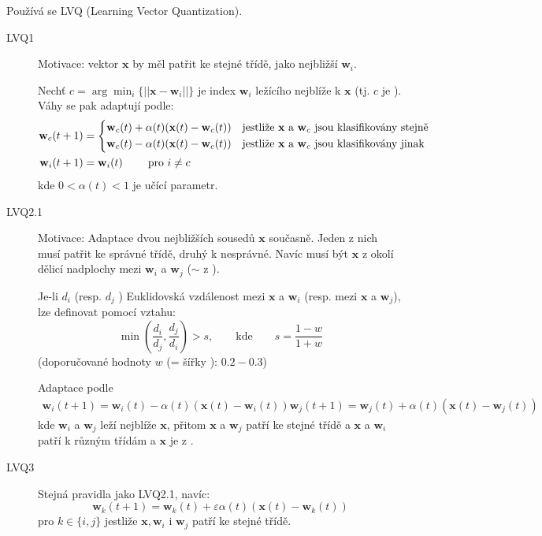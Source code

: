 \documentclass[11pt]{report} %
\renewcommand{\vec}[1]{\mathbf{#1}}
\numberwithin{equation}{section}
\begin{document}
Používá se LVQ (Learning Vector Quantization).
\begin{description}
	\item[LVQ1] Motivace: vektor $\vec{x}$ by měl patřit ke stejné třídě, jako nejbližší $\vec{w}_i$. 
	
	Nechť $c = \arg \min_{i}\{||\vec{x} - \vec{w}_i||\}$ je index $\vec{w}_i$ ležícího nejblíže k $\vec{x}$ (tj. $c$ je ). Váhy se pak adaptují podle:
	\begin{align*}
		\vec{w}_c(t+1) &= 
		\begin{dcases*}
		\vec{w}_c(t) + \alpha(t)(\vec{x}(t) - \vec{w}_c(t)) & jestliže $\vec{x}$ a $\vec{w}_c$ jsou klasifikovány stejně \\
		\vec{w}_c(t) - \alpha(t)(\vec{x}(t) - \vec{w}_c(t)) & jestliže $\vec{x}$ a $\vec{w}_c$ jsou klasifikovány jinak \\
		\end{dcases*}	\\
		\vec{w}_i(t+1) &= \vec{w}_i(t)\qquad \text{ pro $i \neq c$}\\
	\end{align*}
	kde $0 < \alpha(t) < 1$ je učící parametr.
	
	\item[LVQ2.1] Motivace: Adaptace dvou nejbližších sousedů $\vec{x}$ současně. Jeden z nich musí patřit ke správné třídě, druhý k nesprávné. Navíc musí být $\vec{x}$ z okolí dělicí nadplochy mezi $\vec{w}_i$ a $\vec{w}_j$ ($\sim$ z ).
	
	Je-li $d_i$ (resp. $d_j$ ) Euklidovská vzdálenost mezi $\vec{x}$ a $\vec{w}_i$ (resp. mezi $\vec{x}$ a $\vec{w}_j$), lze  definovat pomocí vztahu:
	$$\min\left(\frac{d_i}{d_j},\frac{d_j}{d_i} \right) > s, \qquad \text{kde}\qquad s = \frac{1-w}{1+w}$$	
	(doporučované hodnoty $w$ (= šířky ): $0.2 - 0.3$)
	
	Adaptace podle
	\begin{align*}
	\vec{w}_i(t+1) = \vec{w}_i(t) - \alpha(t)(\vec{x}(t) - \vec{w}_i(t))		
	\vec{w}_j(t+1) = \vec{w}_j(t) + \alpha(t)(\vec{x}(t) - \vec{w}_j(t))
	\end{align*}
	kde $\vec{w}_i$ a $\vec{w}_j$ leží nejblíže $\vec{x}$, přitom $\vec{x}$ a $\vec{w}_j$ patří ke stejné třídě a $\vec{x}$ a $\vec{w}_i$ patří k různým třídám a $\vec{x}$ je z .
	
	\item[LVQ3] Stejná pravidla jako LVQ2.1, navíc:
	$$\vec{w}_k(t+1) = \vec{w}_k(t) + \varepsilon\alpha(t)(\vec{x}(t) - \vec{w}_k(t))$$
	pro $k\in \{i,j\}$ jestliže $\vec{x}, \vec{w}_i$ i $\vec{w}_j$ patří ke stejné třídě.
\end{description}
\end{document}
